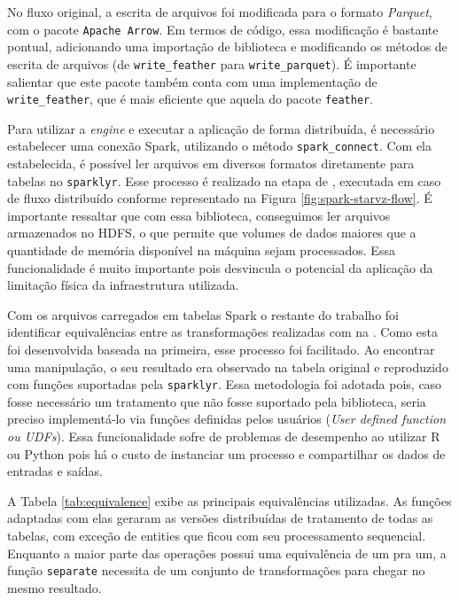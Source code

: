 No fluxo original, a escrita de arquivos foi modificada para o formato 
\textit{Parquet}, com o pacote \texttt{Apache Arrow}. Em termos de código, essa 
modificação é bastante pontual, adicionando uma importação de biblioteca e 
modificando os métodos de escrita de arquivos (de \texttt{write\_feather} 
para \texttt{write\_parquet}). É importante salientar que este pacote também 
conta com uma implementação de \texttt{write\_feather}, que é mais eficiente 
que aquela do pacote \texttt{feather}.

Para utilizar a \textit{engine} e executar a aplicação de forma distribuída, é 
necessário estabelecer uma conexão Spark, utilizando o método 
\texttt{spark\_connect}. Com ela estabelecida, é possível ler arquivos em 
diversos formatos diretamente para tabelas no \texttt{sparklyr}. Esse processo 
é realizado na etapa de , executada em caso de fluxo 
distribuído conforme representado na Figura \ref{fig:spark-starvz-flow}. É 
importante ressaltar que com essa biblioteca, conseguimos ler arquivos 
armazenados no HDFS, o que permite que volumes de dados maiores que a quantidade 
de memória disponível na máquina sejam processados. Essa funcionalidade é muito 
importante pois desvincula o potencial da aplicação da limitação física da 
infraestrutura utilizada.

Com os arquivos carregados em tabelas Spark o restante do trabalho 
foi identificar equivalências entre as transformações realizadas com 
 na . Como esta foi desenvolvida baseada na 
primeira, esse processo foi facilitado. Ao encontrar uma manipulação, o seu 
resultado era observado na tabela original e reproduzido com funções suportadas 
pela \texttt{sparklyr}. Essa metodologia foi adotada pois, caso fosse necessário 
um tratamento que não fosse suportado pela biblioteca, seria preciso 
implementá-lo via funções definidas pelos usuários (\emph{User defined function 
ou UDFs}). Essa funcionalidade sofre de problemas de desempenho ao utilizar R ou 
Python pois há o custo de instanciar um processo e compartilhar os dados de 
entradas e saídas. 

A Tabela \ref{tab:equivalence} exibe as principais equivalências utilizadas. 
As funções adaptadas com elas geraram as versões distribuídas de tratamento de 
todas as tabelas, com exceção de entities que ficou com seu processamento 
sequencial. Enquanto a maior parte das operações possui uma equivalência de um 
pra um, a função \texttt{separate} necessita de um conjunto de transformações 
para chegar no mesmo resultado. 

